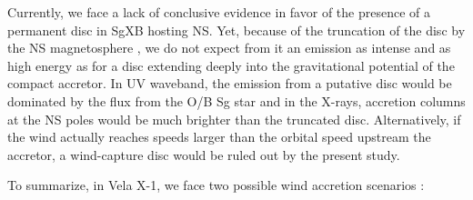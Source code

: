 \documentclass{aa}
\makeatletter
\newcommand{\sgx}{SgXB\xspace}
\newcommand*{\ns}{NS\@\xspace}
\makeatother
\begin{document}
Currently, we face a lack of conclusive evidence in favor of the presence of a permanent disc in \sgx hosting \ns \citep{Bozzo2008,Shakura2012,Romano2015,Hu2017}. Yet, because of the truncation of the disc by the \ns magnetosphere \citep{Ghosh1978}, we do not expect from it an emission as intense and as high energy as for a disc extending deeply into the gravitational potential of the compact accretor. In UV waveband, the emission from a putative disc would be dominated by the flux from the O/B Sg star and in the X-rays, accretion columns at the \ns poles would be much brighter than the truncated disc. Alternatively, if the wind actually reaches speeds larger than the orbital speed upstream the accretor, a wind-capture disc would be ruled out by the present study.

To summarize, in Vela X-1, we face two possible wind accretion scenarios :
\end{document}
